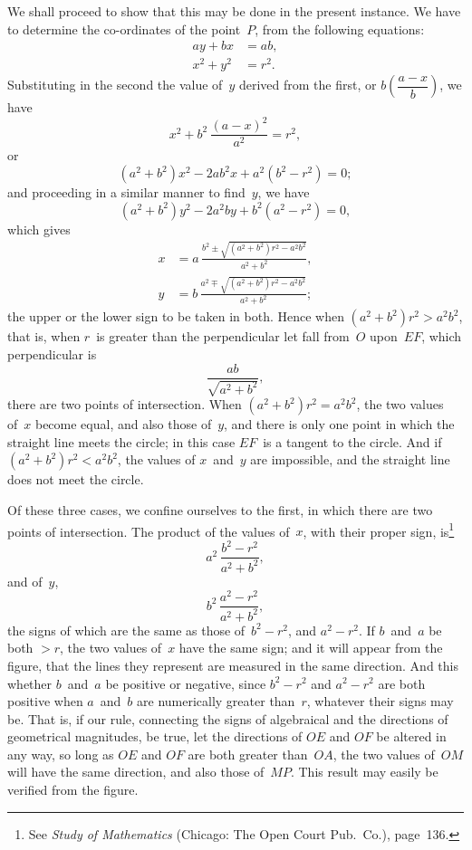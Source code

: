 \documentclass[12pt]{book}[2005/09/16]
\newcommand{\Typo}[2]{#2}
\newcommand{\Pagelabel}[1]{\phantomsection\label{page:#1}}
\newcommand{\PageSep}[1]{\Pagelabel{#1}\ignorespaces}
\renewcommand{\(}{{\upshape(}}
\renewcommand{\)}{{\upshape)}}
\newcommand{\Title}[1]{\textit{#1}}
\begin{document}
We shall proceed to show that this may be done
in the present instance. We have to determine the
co-ordinates of the point~$P$, from the following equations:
\begin{align*}
ay + bx &= ab, \\
x^{2} + y^{2} &= r^{2}.
\end{align*}
Substituting in the second the value of~$y$ derived from
the first, or $b\left(\dfrac{a - x}{b}\right)$, we have
\[
x^{2} + b^{2}\, \frac{(a - x)^{2}}{a^{2}} = r^{2},
\]
or
\[
(a^{2} + b^{2}) x^{2} - 2ab^{2}x + a^{2}(b^{2} - r^{2}) = 0;
\]
and proceeding in a similar manner to find~$y$, we have
\[
(a^{2} + b^{2}) y^{2} - 2a^{2}by + b^{2}(a^{2} - r^{2}) = 0,
\]
which \Typo{give}{gives}
\begin{align*}
x &= a\, \frac{b^{2} ± \sqrt{(a^{2} + b^{2})r^{2} - a^{2}b^{2}}}{a^{2} + b^{2}}, \\
y &= b\, \frac{a^{2} \mp \sqrt{(a^{2} + b^{2})r^{2} - a^{2}b^{2}}}{a^{2} + b^{2}};
\end{align*}
the upper or the lower sign to be taken in both.
Hence when $(a^{2} + b^{2})r^{2} > a^{2}b^{2}$, that is, when $r$~is greater
than the perpendicular let fall from~$O$ upon~$EF$, which
perpendicular is
\PageSep{34}
\[
\frac{ab}{\sqrt{a^{2} + b^{2}}},
\]
there are two points of intersection. When $(a^{2} + b^{2})r^{2} = a^{2}b^{2}$,
the two values of~$x$ become equal, and also
those of~$y$, and there is only one point in which the
straight line meets the circle; in this case $EF$~is a
tangent to the circle. And if $(a^{2} + b^{2})r^{2} < a^{2}b^{2}$, the
values of $x$~and~$y$ are impossible, and the straight line
does not meet the circle.

Of these three cases, we confine ourselves to the
first, in which there are two points of intersection.
The product of the values of~$x$, with their proper
sign, is\footnote
  {See \Title{Study of Mathematics} (Chicago: The Open Court Pub.~Co.), page~136.}
\[
a^{2}\, \frac{b^{2} - r^{2}}{a^{2} + b^{2}},
\]
and of~$y$,
\[
b^{2}\, \frac{a^{2} - r^{2}}{a^{2} + b^{2}},
\]
the signs of which are the same as those of~$b^{2} - r^{2}$,
and $a^{2} - r^{2}$. If $b$~and~$a$ be both $> r$, the two values
of~$x$ have the same sign; and it will appear from the
figure, that the lines they represent are measured in
the same direction. And this whether $b$~and~$a$ be positive
or negative, since $b^{2} - r^{2}$ and $a^{2} - r^{2}$ are both
positive when $a$~and~$b$ are numerically greater than~$r$,
whatever their signs may be. That is, if our rule,
connecting the signs of algebraical and the directions
of geometrical magnitudes, be true, let the directions
of $OE$ and $OF$ be altered in any way, so long as $OE$
and $OF$ are both greater than~$OA$, the two values of~$OM$
will have the same direction, and also those of~$MP$.
This result may easily be verified from the
figure.
\PageSep{35}
\end{document}
